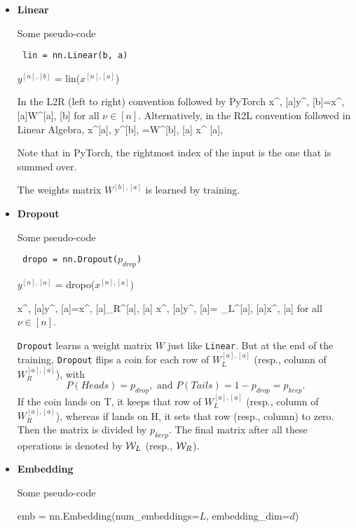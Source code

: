 \begin{itemize}
\item {\bf Linear}

Some pseudo-code
\begin{mdframed}[hidealllines=true,backgroundcolor=blue!10]
{\tt
lin = nn.Linear(b, a)

$y^{[n], [b]}$ = lin($x^{[n],[a]}$)
}
\end{mdframed}
In the L2R (left to right) convention followed by PyTorch
\beq
x^{\nu, [a]}\rarrow y^{\nu, [b]}=x^{\nu, [a]}W^{[a], [b]}
\eeq
for all  $\nu\in[n]$. Alternatively, in
the R2L convention followed in Linear Algebra,
\beq
x^{[a], \nu}\rarrow y^{[b], \nu}=W^{[b], [a]}
x^{ [a], \nu}
\eeq
 
Note that in PyTorch, the rightmost index of the input is the 
one that is summed over.

The weights matrix $W^{[b], [a]}$ is learned by training.

\item {\bf Dropout}

Some pseudo-code
\begin{mdframed}[hidealllines=true,backgroundcolor=blue!10]
{\tt
dropo = nn.Dropout($p_{drop}$)

$y^{[n], [a]}$ = dropo($x^{[n],[a]}$)
}
\end{mdframed}


\beq
x^{\nu, [a]}\rarrow y^{\nu, [a]}=x^{\nu, [a]}\calw_R^{[a], [a]}
\;\;
\eeq
\beq
x^{\nu, [a]}\rarrow y^{\nu, [a]}=
\calw_L^{[a], [a]}x^{\nu, [a]}
\;\;
\eeq
for all  $\nu\in[n]$.

{\tt Dropout} learns a weight matrix $W$ just like
{\tt Linear}. But at the end of the
training,
{\tt  Dropout} flips a coin
for each row of $W_L^{[a], [a]}$ (resp., column of $W_R^{[a], [a]}$), with $$P(Heads)=p_{drop}, \text{ and } P(Tails)=1-p_{drop}=p_{keep}.$$If the coin lands on T, it keeps that row of $W_L^{[a], [a]}$ (resp., column of $W_R^{[a], [a]}$), whereas if lands on H,
it sets that row (resp., column) to zero. Then the
matrix  is
divided by $p_{keep}$.
The final matrix after all these operations  is denoted by ${\cal W}_L$ (resp., ${\cal W}_R$).



\item {\bf Embedding}

Some pseudo-code
\begin{mdframed}[hidealllines=true,backgroundcolor=blue!10]
{\tt

emb = nn.Embedding(num\_embeddings=$L$, embedding\_dim=$d$)

}
\end{mdframed}
\end{itemize}
